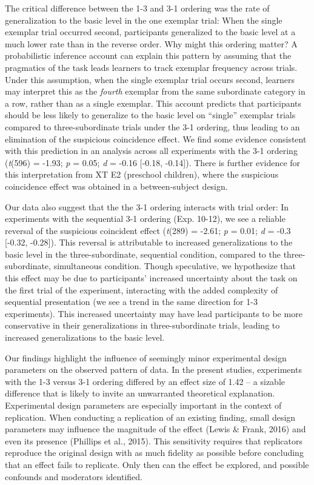 \documentclass[english,floatsintext,man]{apa6}
\theoremstyle{definition}
\theoremstyle{definition}
\theoremstyle{definition}
\theoremstyle{remark}
\begin{document}
The critical difference between the 1-3 and 3-1 ordering was the rate of
generalization to the basic level in the one exemplar trial: When the
single exemplar trial occurred second, participants generalized to the
basic level at a much lower rate than in the reverse order. Why might
this ordering matter? A probabilistic inference account can explain this
pattern by assuming that the pragmatics of the task leads learners to
track exemplar frequency across trials. Under this assumption, when the
single exemplar trial occurs second, learners may interpret this as the
\emph{fourth} exemplar from the same subordinate category in a row,
rather than as a single exemplar. This account predicts that
participants should be less likely to generalize to the basic level on
\enquote{single} exemplar trials compared to three-subordinate trials
under the 3-1 ordering, thus leading to an elimination of the suspicious
coincidence effect. We find some evidence consistent with this
prediction in an analysis across all experiments with the 3-1 ordering
(\emph{t}(596) = -1.93; \emph{p} = 0.05; \emph{d} = -0.16 {[}-0.18,
-0.14{]}). There is further evidence for this interpretation from XT E2
(preschool children), where the suspicious coincidence effect was
obtained in a between-subject design.

Our data also suggest that the the 3-1 ordering interacts with trial
order: In experiments with the sequential 3-1 ordering (Exp. 10-12), we
see a reliable reversal of the suspicious coincident effect
(\emph{t}(289) = -2.61; \emph{p} = 0.01; \emph{d} = -0.3 {[}-0.32,
-0.28{]}). This reversal is attributable to increased generalizations to
the basic level in the three-subordinate, sequential condition, compared
to the three-subordinate, simultaneous condition. Though speculative, we
hypothesize that this effect may be due to participants' increased
uncertainty about the task on the first trial of the experiment,
interacting with the added complexity of sequential presentation (we see
a trend in the same direction for 1-3 experiments). This increased
uncertainty may have lead participants to be more conservative in their
generalizations in three-subordinate trials, leading to increased
generalizations to the basic level.

Our findings highlight the influence of seemingly minor experimental
design parameters on the observed pattern of data. In the present
studies, experiments with the 1-3 versus 3-1 ordering differed by an
effect size of 1.42 -- a sizable difference that is likely to invite an
unwarranted theoretical explanation. Experimental design parameters are
especially important in the context of replication. When conducting a
replication of an existing finding, small design parameters may
influence the magnitude of the effect (Lewis \& Frank, 2016) and even
its presence (Phillips et al., 2015). This sensitivity requires that
replicators reproduce the original design with as much fidelity as
possible before concluding that an effect fails to replicate. Only then
can the effect be explored, and possible confounds and moderators
identified.
\end{document}
